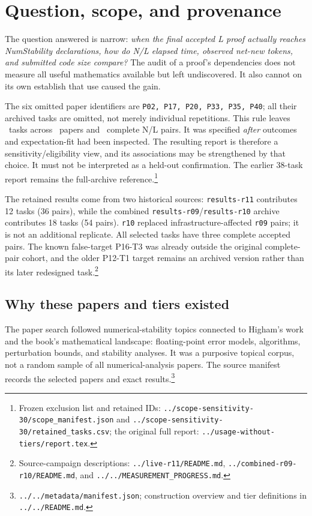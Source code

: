 \documentclass[10pt]{article}
\newcommand{\pathref}[1]{\nolinkurl{#1}}
\begin{document}
\section{Question, scope, and provenance}
The question answered is narrow: \emph{when the final accepted L proof actually reaches NumStability declarations, how do N/L elapsed time, observed net-new tokens, and submitted code size compare?} The audit of a proof's dependencies does not measure all useful mathematics available but left undiscovered. It also cannot on its own establish that use caused the gain.

The six omitted paper identifiers are \texttt{P02, P17, P20, P33, P35, P40}; all their archived tasks are omitted, not merely individual repetitions. This rule leaves \ReportTasks\ tasks across \ReportPapers\ papers and \ReportPairs\ complete N/L pairs. It was specified \emph{after} outcomes and expectation-fit had been inspected. The resulting report is therefore a sensitivity/eligibility view, and its associations may be strengthened by that choice. It must not be interpreted as a held-out confirmation. The earlier 38-task report remains the full-archive reference.\footnote{Frozen exclusion list and retained IDs: \pathref{../scope-sensitivity-30/scope_manifest.json} and \pathref{../scope-sensitivity-30/retained_tasks.csv}; the original full report: \pathref{../usage-without-tiers/report.tex}.}

The retained results come from two historical sources: \texttt{results-r11} contributes 12 tasks (36 pairs), while the combined \texttt{results-r09}/\texttt{results-r10} archive contributes 18 tasks (54 pairs). \texttt{r10} replaced infrastructure-affected \texttt{r09} pairs; it is not an additional replicate. All selected tasks have three complete accepted pairs. The known false-target P16-T3 was already outside the original complete-pair cohort, and the older P12-T1 target remains an archived version rather than its later redesigned task.\footnote{Source-campaign descriptions: \pathref{../live-r11/README.md}, \pathref{../combined-r09-r10/README.md}, and \pathref{../../MEASUREMENT_PROGRESS.md}.}

\subsection*{Why these papers and tiers existed}
The paper search followed numerical-stability topics connected to Higham's work and the book's mathematical landscape: floating-point error models, algorithms, perturbation bounds, and stability analyses. It was a purposive topical corpus, not a random sample of all numerical-analysis papers. The source manifest records the selected papers and exact results.\footnote{\pathref{../../metadata/manifest.json}; construction overview and tier definitions in \pathref{../../README.md}.}
\end{document}
